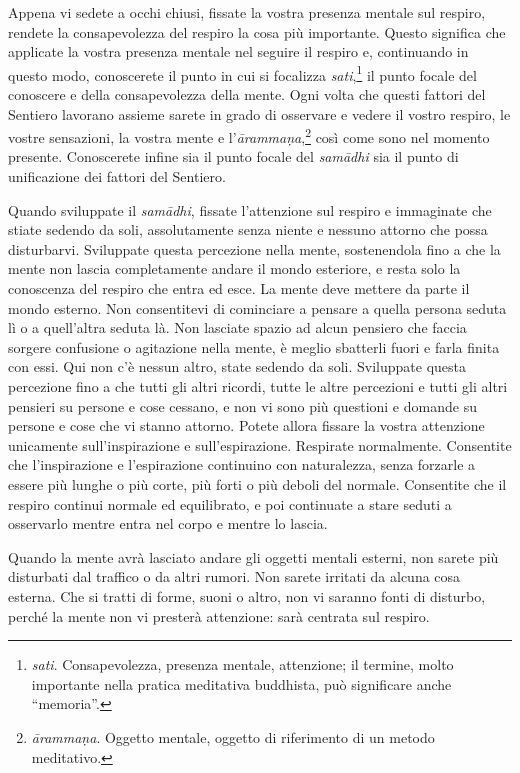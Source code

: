 Appena vi sedete a occhi chiusi, fissate la vostra presenza mentale sul
respiro, rendete la consapevolezza del respiro la cosa più importante.
Questo significa che applicate la vostra presenza mentale nel seguire il
respiro e, continuando in questo modo, conoscerete il punto in cui si
focalizza \emph{sati},\footnote{\emph{sati}. Consapevolezza, presenza
  mentale, attenzione; il termine, molto importante nella pratica
  meditativa buddhista, può significare anche ``memoria''.} il punto
focale del conoscere e della consapevolezza della mente. Ogni volta che
questi fattori del Sentiero lavorano assieme sarete in grado di
osservare e vedere il vostro respiro, le vostre sensazioni, la vostra
mente e l'\emph{ārammaṇa},\footnote{\emph{ārammaṇa}. Oggetto mentale,
  oggetto di riferimento di un metodo meditativo.} così come sono nel
momento presente. Conoscerete infine sia il punto focale del
\emph{samādhi} sia il punto di unificazione dei fattori del Sentiero.

Quando sviluppate il \emph{samādhi}, fissate l'attenzione sul respiro e
immaginate che stiate sedendo da soli, assolutamente senza niente e
nessuno attorno che possa disturbarvi. Sviluppate questa percezione
nella mente, sostenendola fino a che la mente non lascia completamente
andare il mondo esteriore, e resta solo la conoscenza del respiro che
entra ed esce. La mente deve mettere da parte il mondo esterno. Non
consentitevi di cominciare a pensare a quella persona seduta lì o a
quell'altra seduta là. Non lasciate spazio ad alcun pensiero che faccia
sorgere confusione o agitazione nella mente, è meglio sbatterli fuori e
farla finita con essi. Qui non c'è nessun altro, state sedendo da soli.
Sviluppate questa percezione fino a che tutti gli altri ricordi, tutte
le altre percezioni e tutti gli altri pensieri su persone e cose
cessano, e non vi sono più questioni e domande su persone e cose che vi
stanno attorno. Potete allora fissare la vostra attenzione unicamente
sull'inspirazione e sull'espirazione. Respirate normalmente. Consentite
che l'inspirazione e l'espirazione continuino con naturalezza, senza
forzarle a essere più lunghe o più corte, più forti o più deboli del
normale. Consentite che il respiro continui normale ed equilibrato, e
poi continuate a stare seduti a osservarlo mentre entra nel corpo e
mentre lo lascia.

Quando la mente avrà lasciato andare gli oggetti mentali esterni, non
sarete più disturbati dal traffico o da altri rumori. Non sarete
irritati da alcuna cosa esterna. Che si tratti di forme, suoni o altro,
non vi saranno fonti di disturbo, perché la mente non vi presterà
attenzione: sarà centrata sul respiro.

